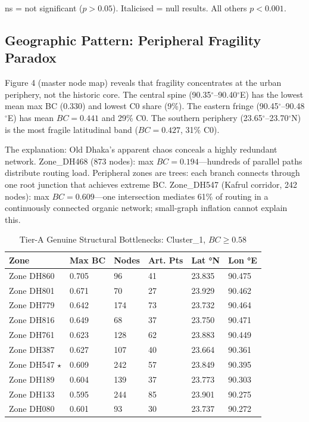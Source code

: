 \documentclass[sigconf, nonacm]{acmart}
\begin{document}
ns = not significant ($p>0.05$). Italicised = null results. All others $p<0.001$.

\subsection{Geographic Pattern: Peripheral Fragility Paradox}

Figure 4 (master node map) reveals that fragility concentrates at the urban periphery, not the historic core. The central spine (90.35$^\circ$--90.40$^\circ$E) has the lowest mean max BC (0.330) and lowest C0 share (9\%). The eastern fringe (90.45$^\circ$--90.48$^\circ$E) has mean $BC = 0.441$ and 29\% C0. The southern periphery (23.65$^\circ$--23.70$^\circ$N) is the most fragile latitudinal band ($BC = 0.427$, 31\% C0). 

The explanation: Old Dhaka's apparent chaos conceals a highly redundant network. Zone\_DH468 (873 nodes): max $BC = 0.194$—hundreds of parallel paths distribute routing load. Peripheral zones are trees: each branch connects through one root junction that achieves extreme BC. Zone\_DH547 (Kafrul corridor, 242 nodes): max $BC = 0.609$—one intersection mediates 61\% of routing in a continuously connected organic network; small-graph inflation cannot explain this.

\begin{table}[h]
\caption{Tier-A Genuine Structural Bottlenecks: Cluster\_1, $BC\ge0.58$}
\begin{tabular}{llllll}
\toprule
Zone & Max BC & Nodes & Art. Pts & Lat °N & Lon °E \\
\midrule
Zone DH860 & 0.705 & 96 & 41 & 23.835 & 90.475 \\
Zone DH801 & 0.671 & 70 & 27 & 23.929 & 90.462 \\
Zone DH779 & 0.642 & 174 & 73 & 23.732 & 90.464 \\
Zone DH816 & 0.649 & 68 & 37 & 23.750 & 90.471 \\
Zone DH761 & 0.623 & 128 & 62 & 23.883 & 90.449 \\
Zone DH387 & 0.627 & 107 & 40 & 23.664 & 90.361 \\
Zone DH547 $\star$ & 0.609 & 242 & 57 & 23.849 & 90.395 \\
Zone DH189 & 0.604 & 139 & 37 & 23.773 & 90.303 \\
Zone DH133 & 0.595 & 244 & 85 & 23.901 & 90.275 \\
Zone DH080 & 0.601 & 93 & 30 & 23.737 & 90.272 \\
\bottomrule
\end{tabular}
\end{table}
\end{document}
